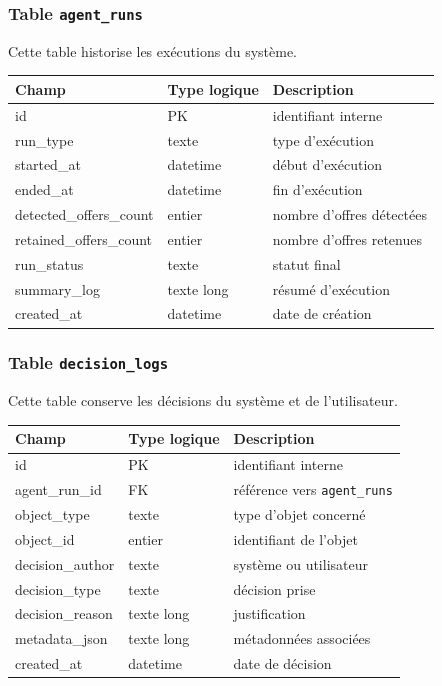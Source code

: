 \documentclass[11pt,a4paper]{article}
\begin{document}
\subsubsection{Table \texttt{agent\_runs}}

Cette table historise les exécutions du système.

\begin{center}
\begin{tabular}{|l|l|l|}
\hline
\textbf{Champ} & \textbf{Type logique} & \textbf{Description} \\
\hline
id & PK & identifiant interne \\
run_type & texte & type d’exécution \\
started_at & datetime & début d’exécution \\
ended_at & datetime & fin d’exécution \\
detected_offers_count & entier & nombre d’offres détectées \\
retained_offers_count & entier & nombre d’offres retenues \\
run_status & texte & statut final \\
summary_log & texte long & résumé d’exécution \\
created_at & datetime & date de création \\
\hline
\end{tabular}
\end{center}

\subsubsection{Table \texttt{decision\_logs}}

Cette table conserve les décisions du système et de l’utilisateur.

\begin{center}
\begin{tabular}{|l|l|l|}
\hline
\textbf{Champ} & \textbf{Type logique} & \textbf{Description} \\
\hline
id & PK & identifiant interne \\
agent_run_id & FK & référence vers \texttt{agent\_runs} \\
object_type & texte & type d’objet concerné \\
object_id & entier & identifiant de l’objet \\
decision_author & texte & système ou utilisateur \\
decision_type & texte & décision prise \\
decision_reason & texte long & justification \\
metadata_json & texte long & métadonnées associées \\
created_at & datetime & date de décision \\
\hline
\end{tabular}
\end{center}
\end{document}
